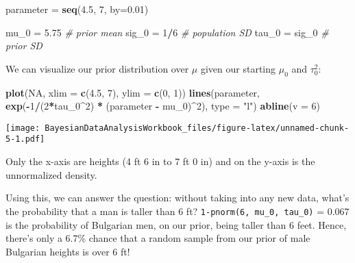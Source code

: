 \documentclass[]{book}
\newenvironment{Shaded}{\begin{snugshade}}{\end{snugshade}}
\newcommand{\KeywordTok}[1]{\textcolor[rgb]{0.13,0.29,0.53}{\textbf{#1}}}
\newcommand{\DataTypeTok}[1]{\textcolor[rgb]{0.13,0.29,0.53}{#1}}
\newcommand{\DecValTok}[1]{\textcolor[rgb]{0.00,0.00,0.81}{#1}}
\newcommand{\FloatTok}[1]{\textcolor[rgb]{0.00,0.00,0.81}{#1}}
\newcommand{\StringTok}[1]{\textcolor[rgb]{0.31,0.60,0.02}{#1}}
\newcommand{\CommentTok}[1]{\textcolor[rgb]{0.56,0.35,0.01}{\textit{#1}}}
\newcommand{\OtherTok}[1]{\textcolor[rgb]{0.56,0.35,0.01}{#1}}
\newcommand{\OperatorTok}[1]{\textcolor[rgb]{0.81,0.36,0.00}{\textbf{#1}}}
\newcommand{\NormalTok}[1]{#1}
\begin{document}
\begin{Shaded}
\begin{Highlighting}[]
\NormalTok{parameter =}\StringTok{ }\KeywordTok{seq}\NormalTok{(}\FloatTok{4.5}\NormalTok{, }\DecValTok{7}\NormalTok{, }\DataTypeTok{by=}\FloatTok{0.01}\NormalTok{)}

\NormalTok{mu_}\DecValTok{0}\NormalTok{ =}\StringTok{ }\FloatTok{5.75} \CommentTok{# prior mean}
\NormalTok{sig_}\DecValTok{0}\NormalTok{ =}\StringTok{ }\DecValTok{1}\OperatorTok{/}\DecValTok{6} \CommentTok{# population SD}
\NormalTok{tau_}\DecValTok{0}\NormalTok{ =}\StringTok{ }\NormalTok{sig_}\DecValTok{0} \CommentTok{# prior SD}
\end{Highlighting}
\end{Shaded}

We can visualize our prior distribution over \(\mu\) given our starting
\(\mu_0\) and \(\tau_0^2\):

\begin{Shaded}
\begin{Highlighting}[]
\KeywordTok{plot}\NormalTok{(}\OtherTok{NA}\NormalTok{, }\DataTypeTok{xlim =} \KeywordTok{c}\NormalTok{(}\FloatTok{4.5}\NormalTok{, }\DecValTok{7}\NormalTok{), }\DataTypeTok{ylim =} \KeywordTok{c}\NormalTok{(}\DecValTok{0}\NormalTok{, }\DecValTok{1}\NormalTok{))}
\KeywordTok{lines}\NormalTok{(parameter, }\KeywordTok{exp}\NormalTok{(}\OperatorTok{-}\DecValTok{1}\OperatorTok{/}\NormalTok{(}\DecValTok{2}\OperatorTok{*}\NormalTok{tau_}\DecValTok{0}\OperatorTok{^}\DecValTok{2}\NormalTok{) }\OperatorTok{*}\StringTok{ }\NormalTok{(parameter }\OperatorTok{-}\StringTok{ }\NormalTok{mu_}\DecValTok{0}\NormalTok{)}\OperatorTok{^}\DecValTok{2}\NormalTok{), }\DataTypeTok{type =} \StringTok{"l"}\NormalTok{)}
\KeywordTok{abline}\NormalTok{(}\DataTypeTok{v =} \DecValTok{6}\NormalTok{)}
\end{Highlighting}
\end{Shaded}

\texttt{[image: BayesianDataAnalysisWorkbook\_files/figure-latex/unnamed-chunk-5-1.pdf]}

Only the x-axis are heights (4 ft 6 in to 7 ft 0 in) and on the y-axis
is the unnormalized density.

Using this, we can answer the question: without taking into any new
data, what's the probability that a man is taller than 6 ft?
\texttt{1-pnorm(6,\ mu\_0,\ tau\_0)} = 0.067 is the probability of
Bulgarian men, on our prior, being taller than 6 feet. Hence, there's
only a 6.7\% chance that a random sample from our prior of male
Bulgarian heights is over 6 ft!
\end{document}
